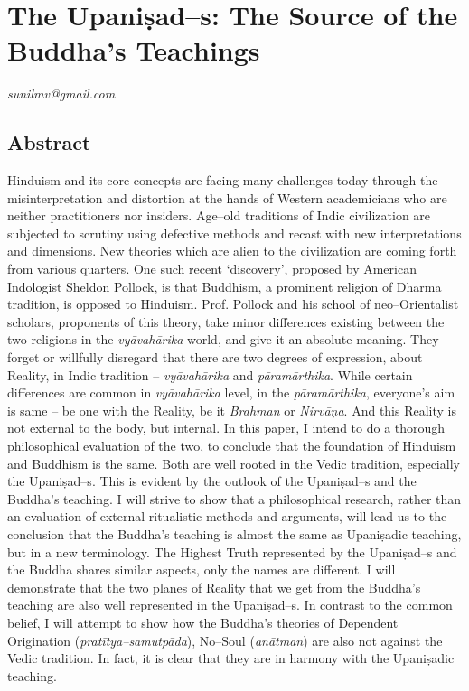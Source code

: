 
\chapter{The Upaniṣad–s: The Source of the Buddha’s Teachings}\label{chapter4}


\begin{flushright}
\textit{sunilmv@gmail.com}
\end{flushright}


\section*{Abstract}

Hinduism and its core concepts are facing many challenges today through the misinterpretation and distortion at the hands of Western academicians who are neither practitioners nor insiders. Age–old traditions of Indic civilization are subjected to scrutiny using defective methods and recast with new interpretations and dimensions. New theories which are alien to the civilization are coming forth from various quarters. One such recent ‘discovery’, proposed by American Indologist Sheldon Pollock, is that Buddhism, a prominent religion of Dharma tradition, is opposed to Hinduism. Prof. Pollock and his school of neo–Orientalist scholars, proponents of this theory, take minor differences existing between the two religions in the \textit{vyāvahārika} world, and give it an absolute meaning. They forget or willfully disregard that there are two degrees of expression, about Reality, in Indic tradition – \textit{vyāvahārika} and \textit{pāramārthika}. While certain differences are common in \textit{vyāvahārika} level, in the \textit{pāramārthika}, everyone’s aim is same – be one with the Reality, be it \textit{Brahman} or \textit{Nirvāṇa}. And this Reality is not external to the body, but internal. In this paper, I intend to do a thorough philosophical evaluation of the two, to conclude that the foundation of Hinduism and Buddhism is the same. Both are well rooted in the Vedic tradition, especially the Upaniṣad–s. This is evident by the outlook of the Upaniṣad–s and the Buddha’s teaching. I will strive to show that a philosophical research, rather than an evaluation of external ritualistic methods and arguments, will lead us to the conclusion that the Buddha’s teaching is almost the same as Upaniṣadic teaching, but in a new terminology. The Highest Truth represented by the Upaniṣad–s and the Buddha shares similar aspects, only the names are different. I will demonstrate that the two planes of Reality that we get from the Buddha’s teaching are also well represented in the Upaniṣad–s. In contrast to the common belief, I will attempt to show how the Buddha’s theories of Dependent Origination (\textit{pratītya–samutpāda}), No–Soul (\textit{anātman}) are also not against the Vedic tradition. In fact, it is clear that they are in harmony with the Upaniṣadic teaching.


